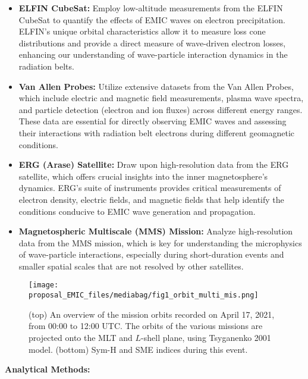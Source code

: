 \documentclass[
  letterpaper,
  DIV=11,
  numbers=noendperiod]{scrartcl}
\begin{document}
\begin{itemize}
\item
  \textbf{ELFIN CubeSat:} Employ low-altitude measurements from the ELFIN CubeSat to quantify the effects of EMIC waves on electron precipitation. ELFIN's unique orbital characteristics allow it to measure loss cone distributions and provide a direct measure of wave-driven electron losses, enhancing our understanding of wave-particle interaction dynamics in the radiation belts.
\item
  \textbf{Van Allen Probes:} Utilize extensive datasets from the Van Allen Probes, which include electric and magnetic field measurements, plasma wave spectra, and particle detection (electron and ion fluxes) across different energy ranges. These data are essential for directly observing EMIC waves and assessing their interactions with radiation belt electrons during different geomagnetic conditions.
\item
  \textbf{ERG (Arase) Satellite:} Draw upon high-resolution data from the ERG satellite, which offers crucial insights into the inner magnetosphere's dynamics. ERG's suite of instruments provides critical measurements of electron density, electric fields, and magnetic fields that help identify the conditions conducive to EMIC wave generation and propagation.
\item
  \textbf{Magnetospheric Multiscale (MMS) Mission:} Analyze high-resolution data from the MMS mission, which is key for understanding the microphysics of wave-particle interactions, especially during short-duration events and smaller spatial scales that are not resolved by other satellites.
\end{itemize}

\begin{figure}[H]

{\centering \texttt{[image: proposal\_EMIC\_files/mediabag/fig1\_orbit\_multi\_mis.png]}

}

\caption{(top) An overview of the mission orbits recorded on April 17, 2021, from 00:00 to 12:00 UTC. The orbits of the various missions are projected onto the MLT and \(L\)-shell plane, using Tsyganenko 2001 model. (bottom) Sym-H and SME indices during this event.}

\end{figure}%

\textbf{Analytical Methods:}
\end{document}
